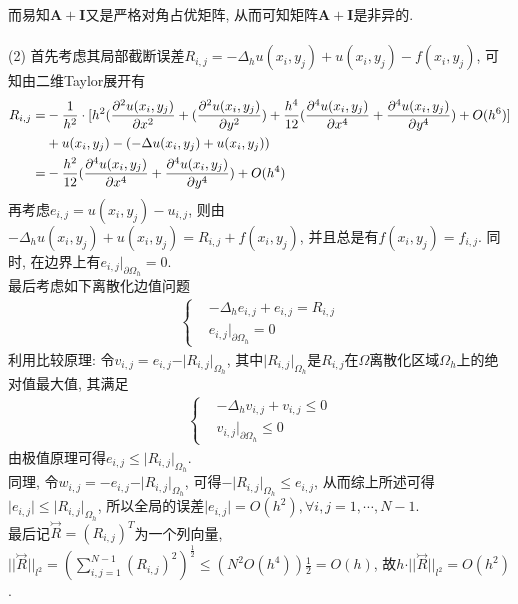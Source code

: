 \documentclass[12pt]{article}
\begin{document}
\noindent 而易知$\boldsymbol{A+I}$又是严格对角占优矩阵, 从而可知矩阵$\boldsymbol{A+I}$是非异的.\\
\quad \\
(2) 首先考虑其局部截断误差$R_{i,j}=-\Delta_hu(x_i,y_j)+u(x_i,y_j)-f(x_i,y_j)$, 可知由二维Taylor展开有
\begin{align*}
	R_{i,j}=&-\frac{1}{h^2} \cdot [h^2(\frac{{\rm \partial}^2u(x_i,y_j)}{{\rm \partial}x^2}+(\frac{{\rm \partial}^2u(x_i,y_j)}{{\rm \partial}y^2})+\frac{h^4}{12}(\frac{{\rm \partial}^4u(x_i,y_j)}{{\rm \partial}x^4}+\frac{{\rm \partial}^4u(x_i,y_j)}{{\rm \partial}y^4})+O(h^6)]\\
	& +u(x_i,y_j) - (-\Delta u(x_i,y_j)+u(x_i,y_j))\\
	=&-\frac{h^2}{12}(\frac{{\rm \partial}^4u(x_i,y_j)}{{\rm \partial}x^4}+\frac{{\rm \partial}^4u(x_i,y_j)}{{\rm \partial}y^4})+O(h^4)
\end{align*}
\noindent 再考虑$e_{i,j}=u(x_i,y_j)-u_{i,j}$, 则由$-\Delta_hu(x_i,y_j)+u(x_i,y_j)=R_{i,j}+f(x_i,y_j)$, 并且总是有$f(x_i,y_j)=f_{i,j}$. 同时, 在边界上有$e_{i,j}\vert_{\partial\Omega _h}=0$.\\
最后考虑如下离散化边值问题
\begin{align*}
	\begin{cases}
		&-\Delta_he_{i,j}+e_{i,j}=R_{i,j}\\
		&e_{i,j}\vert_{\partial\Omega _h}=0
	\end{cases}
\end{align*}
\noindent 利用比较原理: 令$v_{i,j}=e_{i,j}-\vert R_{i,j}\vert_{ \Omega_h} $, 其中$\vert R_{i,j}\vert_{ \Omega_h}$是$R_{i,j}$在$\Omega$离散化区域$\Omega_h$上的绝对值最大值, 其满足
\begin{align*}
	\begin{cases}
		&-\Delta_hv_{i,j}+v_{i,j}\le0\\
		&v_{i,j}\vert _{\partial\Omega_h}\le0
	\end{cases}
\end{align*}
\noindent 由极值原理可得$e_{i,j}\le \vert R_{i,j}\vert_{ \Omega_h}$.\\
同理, 令$w_{i,j}=-e_{i,j}-\vert R_{i,j}\vert_{ \Omega_h}$, 可得$-\vert R_{i,j}\vert_{ \Omega_h}\le e_{i,j}$, 从而综上所述可得$\vert e_{i,j}\vert \le\vert R_{i,j}\vert_{ \Omega_h} $, 所以全局的误差$\vert e_{i,j}\vert = O(h^2), \forall i,j=1,\cdots,N-1$.\\
\noindent 最后记$\overset{\rightarrowtail}{R}=(R_{i,j})^T$为一个列向量, $\vert \vert\overset{\rightarrowtail}{R}\vert \vert_{l^2}=(\sum_{i,j=1}^{N-1}(R_{i,j})^2)^{\frac{1}{2}}\le (N^2O(h^4))\frac{1}{2}=O(h) $, 故$h\cdot \vert \vert\overset{\rightarrowtail}{R}\vert \vert_{l^2}=O(h^2)$.\\
\end{document}
